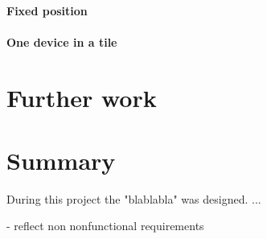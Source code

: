 \paragraph{Fixed position}

\paragraph{One device in a tile}

\section{Further work}

\section{Summary}

During this project the "blablabla" was designed. ...


- reflect non nonfunctional requirements